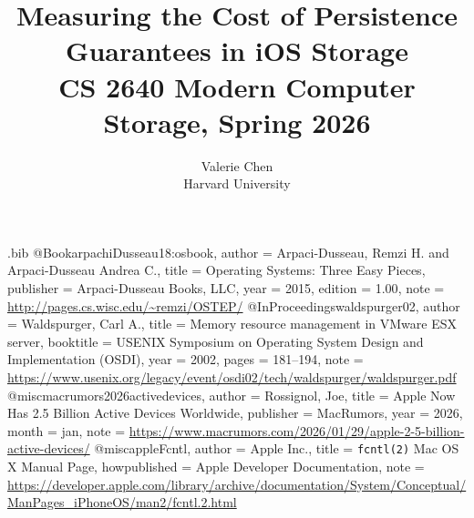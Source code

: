 \usepackage{filecontents}

\begin{filecontents}{\jobname.bib}
@Book{arpachiDusseau18:osbook,
  author =       {Arpaci-Dusseau, Remzi H. and Arpaci-Dusseau Andrea C.},
  title =        {Operating Systems: Three Easy Pieces},
  publisher =    {Arpaci-Dusseau Books, LLC},
  year =         2015,
  edition =      {1.00},
  note =         {\url{http://pages.cs.wisc.edu/~remzi/OSTEP/}}
}
@InProceedings{waldspurger02,
  author =       {Waldspurger, Carl A.},
  title =        {Memory resource management in {VMware ESX} server},
  booktitle =    {USENIX Symposium on Operating System Design and
                  Implementation (OSDI)},
  year =         2002,
  pages =        {181--194},
  note =         {\url{https://www.usenix.org/legacy/event/osdi02/tech/waldspurger/waldspurger.pdf}}
}
@misc{macrumors2026activedevices,
  author    = {Rossignol, Joe},
  title     = {Apple Now Has 2.5 Billion Active Devices Worldwide},
  publisher = {MacRumors},
  year      = {2026},
  month     = jan,
  note      = {\url{https://www.macrumors.com/2026/01/29/apple-2-5-billion-active-devices/}}
}
@misc{appleFcntl,
  author       = {{Apple Inc.}},
  title        = {\texttt{fcntl(2)} {Mac} {OS} {X} {Manual} {Page}},
  howpublished = {Apple Developer Documentation},
  note         = {\url{https://developer.apple.com/library/archive/documentation/System/Conceptual/ManPages_iPhoneOS/man2/fcntl.2.html}}
}
\end{filecontents}



\date{}

\title{\Large \bf Measuring the Cost of Persistence Guarantees in iOS Storage\\{\rm CS 2640 Modern Computer Storage, Spring 2026}}

\author{
{\rm Valerie Chen}\\
Harvard University\\
}



